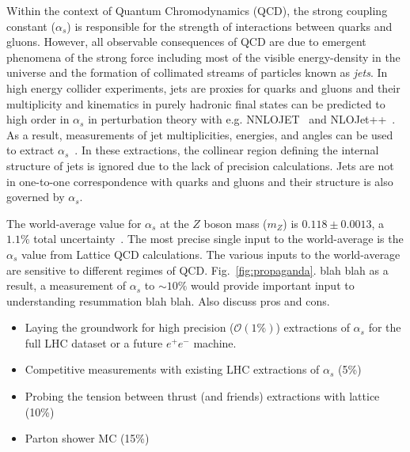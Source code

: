 
Within the context of Quantum Chromodynamics (QCD), the strong coupling constant ($\alpha_s$) is responsible for the strength of interactions between quarks and gluons.  However, all observable consequences of QCD are due to emergent phenomena of the strong force including most of the visible energy-density in the universe and the formation of collimated streams of particles known as \textit{jets}.   In high energy collider experiments, jets are proxies for quarks and gluons and their multiplicity and kinematics in purely hadronic final states can be predicted to high order in $\alpha_s$ in perturbation theory with e.g. NNLOJET~\cite{Currie:2016bfm,Currie:2017ctp} and NLOJet++~\cite{Nagy:2001fj,Nagy:2003tz}.  As a result, measurements of jet multiplicities, energies, and angles can be used to extract $\alpha_s$~\cite{ATLAS:2015yaa,Aaboud:2017fml,Khachatryan:2014waa,CMS:2014mna,Chatrchyan:2013txa}.  In these extractions, the collinear region defining the internal structure of jets is ignored due to the lack of precision calculations.  Jets are not in one-to-one correspondence with quarks and gluons and their structure is also governed by $\alpha_s$.  

The world-average value for $\alpha_s$ at the $Z$ boson mass ($m_Z$) is $0.118\pm 0.0013$, a $1.1\%$ total uncertainty~\cite{Olive:2016xmw}.  The most precise single input to the world-average is the $\alpha_s$ value from Lattice QCD calculations.   The various inputs to the world-average are sensitive to different regimes of QCD.  Fig.~\ref{fig:propaganda}.  blah blah as a result, a measurement of $\alpha_s$ to $\sim 10\%$ would provide important input to understanding resummation blah blah.  Also discuss pros and cons.

\begin{itemize}
\item Laying the groundwork for high precision ($\mathcal{O}(1\%)$) extractions of $\alpha_s$ for the full LHC dataset or a future $e^+e^-$ machine.
\item Competitive measurements with existing LHC extractions of $\alpha_s$ (5\%)
\item Probing the tension between thrust (and friends) extractions with lattice (10\%)
\item Parton shower MC (15\%)
\end{itemize}

